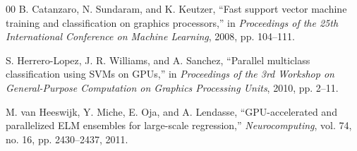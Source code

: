 \documentclass[conference]{IEEEtran}
\begin{document}
\begin{thebibliography}{00}
B. Catanzaro, N. Sundaram, and K. Keutzer, ``Fast support vector machine training and classification on graphics processors,'' in \textit{Proceedings of the 25th International Conference on Machine Learning}, 2008, pp. 104--111.

S. Herrero-Lopez, J. R. Williams, and A. Sanchez, ``Parallel multiclass classification using SVMs on GPUs,'' in \textit{Proceedings of the 3rd Workshop on General-Purpose Computation on Graphics Processing Units}, 2010, pp. 2--11.

M. van Heeswijk, Y. Miche, E. Oja, and A. Lendasse, ``GPU-accelerated and parallelized ELM ensembles for large-scale regression,'' \textit{Neurocomputing}, vol. 74, no. 16, pp. 2430--2437, 2011.

\end{thebibliography}
\end{document}
